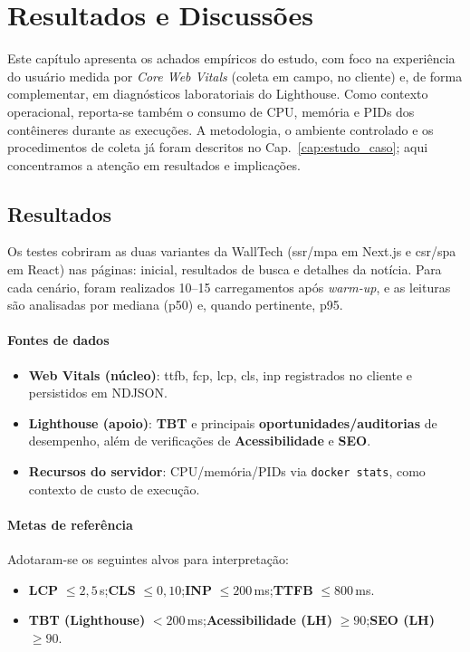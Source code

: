 \chapter{Resultados e Discussões}
\label{cap:resultados}

Este capítulo apresenta os achados empíricos do estudo, com foco na experiência do usuário medida por \textit{Core Web Vitals} (coleta em campo, no cliente) e, de forma complementar, em diagnósticos laboratoriais do Lighthouse. Como contexto operacional, reporta-se também o consumo de CPU, memória e PIDs dos contêineres durante as execuções. A metodologia, o ambiente controlado e os procedimentos de coleta já foram descritos no Cap.~\ref{cap:estudo_caso}; aqui concentramos a atenção em resultados e implicações.

\section{Resultados}
Os testes cobriram as duas variantes da WallTech (\acrshort{ssr}/\acrshort{mpa} em Next.js e \acrshort{csr}/\acrshort{spa} em React) nas páginas: inicial, resultados de busca e detalhes da notícia. Para cada cenário, foram realizados 10--15 carregamentos após \textit{warm-up}, e as leituras são analisadas por mediana (p50) e, quando pertinente, p95.

\subsubsection*{Fontes de dados}
\begin{itemize}
  \item \textbf{Web Vitals (núcleo)}: \acrshort{ttfb}, \acrshort{fcp}, \acrshort{lcp}, \acrshort{cls}, \acrshort{inp} registrados no cliente e persistidos em NDJSON.
  \item \textbf{Lighthouse (apoio)}: \textbf{TBT} e principais \textbf{oportunidades/auditorias} de desempenho, além de verificações de \textbf{Acessibilidade} e \textbf{SEO}.
  \item \textbf{Recursos do servidor}: CPU/memória/PIDs via \texttt{docker stats}, como contexto de custo de execução.
\end{itemize}

\subsubsection*{Metas de referência}
Adotaram-se os seguintes alvos para interpretação:
\begin{itemize}
  \item \textbf{LCP} $\leq 2{,}5$\,s;\quad \textbf{CLS} $\leq 0{,}10$;\quad \textbf{INP} $\leq 200$\,ms;\quad \textbf{TTFB} $\leq 800$\,ms.
  \item \textbf{TBT (Lighthouse)} $<200$\,ms;\quad \textbf{Acessibilidade (LH)} $\geq 90$;\quad \textbf{SEO (LH)} $\geq 90$.
\end{itemize}

